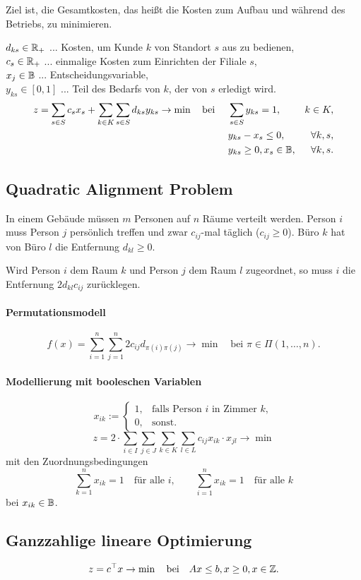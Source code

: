 Ziel ist, die Gesamtkosten, das heißt die Kosten zum Aufbau
und während des Betriebs, zu minimieren.

$d_{ks} \in \mathbb{R}_+$ ... Kosten, um Kunde $k$ von Standort $s$ aus zu bedienen,
\\
$c_s \in \mathbb{R}_+$ ... einmalige Kosten zum Einrichten der Filiale $s$, \\
$x_j \in \mathbb{B}$ ... Entscheidungsvariable, \\
$y_{ks} \in [0,1]$ ... Teil des Bedarfs von $k$, der von $s$ erledigt wird.
\[ \begin{aligned}
    z &= \sum_{s \in S} c_s x_s + \sum_{k \in K} \sum_{s \in S} d_{ks} y_{ks} \to
    \min \quad \text{bei } &
    &\sum_{s \in S} y_{ks} = 1, & k \in K, \\
    & &
    &y_{ks} - x_s \le 0, & \forall k, s, \\
    & &
    &y_{ks} \ge 0, x_s \in \mathbb{B}, & \forall k, s.
  \end{aligned}
\]

\subsection{Quadratic Alignment Problem}
In einem Gebäude müssen $m$ Personen auf $n$ Räume verteilt werden. Person $i$
muss Person $j$ persönlich treffen und zwar $c_{ij}$-mal täglich ($c_{ij} \ge
0$). Büro $k$ hat von Büro $l$ die Entfernung $d_{kl} \ge 0$.

Wird Person $i$ dem Raum $k$ und Person $j$ dem Raum $l$ zugeordnet, so muss $i$
die Entfernung $2 d_{kl} c_{ij}$ zurücklegen.

\paragraph{Permutationsmodell}
\[ f(x) = \sum_{i=1}^n \sum_{j=1}^n 2 c_{ij} d_{\pi(i) \pi(j)} \to \min \quad
  \text{bei } \pi \in \Pi(1, \ldots, n). \]

\paragraph{Modellierung mit booleschen Variablen}
\[ x_{ik} := \begin{cases}
    1, &\text{falls Person $i$ in Zimmer $k$}, \\
    0, &\text{sonst.}
  \end{cases} \]
\[ z = 2 \cdot \sum_{i \in I} \sum_{j \in J} \sum_{k \in K} \sum_{l \in L} c_{ij}
  x_{ik} \cdot x_{jl} \to \min \]
mit den Zuordnungsbedingungen
\[ \sum_{k = 1}^n x_{ik} = 1 \quad \text{für alle } i, \qquad
    \sum_{i = 1}^n x_{ik} = 1 \quad \text{für alle } k \]
bei $x_{ik} \in \mathbb{B}$.

\subsection{Ganzzahlige lineare Optimierung}
\[ z = c^\top x \to \min \quad \text{bei} \quad Ax \le b, x \ge 0, x \in
  \mathbb{Z}. \]
